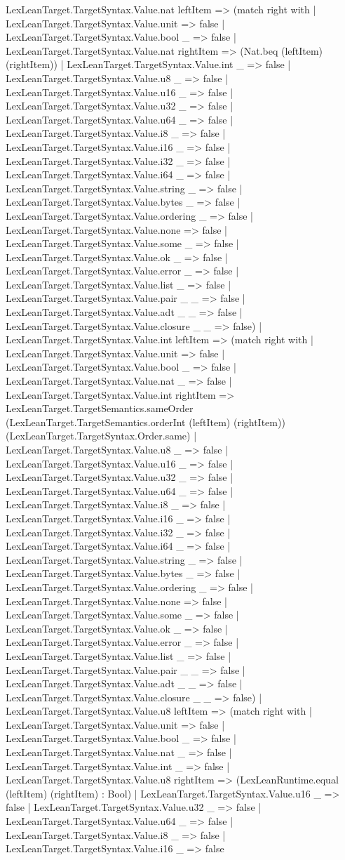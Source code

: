 \documentclass[11pt]{article}
\begin{document}
LexLeanTarget.TargetSyntax.Value.nat leftItem => (match right with | LexLeanTarget.TargetSyntax.Value.unit => false | LexLeanTarget.TargetSyntax.Value.bool \_ => false | LexLeanTarget.TargetSyntax.Value.nat rightItem => (Nat.beq (leftItem) (rightItem)) | LexLeanTarget.TargetSyntax.Value.int \_ => false | LexLeanTarget.TargetSyntax.Value.u8 \_ => false | LexLeanTarget.TargetSyntax.Value.u16 \_ => false | LexLeanTarget.TargetSyntax.Value.u32 \_ => false | LexLeanTarget.TargetSyntax.Value.u64 \_ => false | LexLeanTarget.TargetSyntax.Value.i8 \_ => false | LexLeanTarget.TargetSyntax.Value.i16 \_ => false | LexLeanTarget.TargetSyntax.Value.i32 \_ => false | LexLeanTarget.TargetSyntax.Value.i64 \_ => false | LexLeanTarget.TargetSyntax.Value.string \_ => false | LexLeanTarget.TargetSyntax.Value.bytes \_ => false | LexLeanTarget.TargetSyntax.Value.ordering \_ => false | LexLeanTarget.TargetSyntax.Value.none => false | LexLeanTarget.TargetSyntax.Value.some \_ => false | LexLeanTarget.TargetSyntax.Value.ok \_ => false | LexLeanTarget.TargetSyntax.Value.error \_ => false | LexLeanTarget.TargetSyntax.Value.list \_ => false | LexLeanTarget.TargetSyntax.Value.pair \_ \_ => false | LexLeanTarget.TargetSyntax.Value.adt \_ \_ => false | LexLeanTarget.TargetSyntax.Value.closure \_ \_ => false) | LexLeanTarget.TargetSyntax.Value.int leftItem => (match right with | LexLeanTarget.TargetSyntax.Value.unit => false | LexLeanTarget.TargetSyntax.Value.bool \_ => false | LexLeanTarget.TargetSyntax.Value.nat \_ => false | LexLeanTarget.TargetSyntax.Value.int rightItem => LexLeanTarget.TargetSemantics.sameOrder (LexLeanTarget.TargetSemantics.orderInt (leftItem) (rightItem)) (LexLeanTarget.TargetSyntax.Order.same) | LexLeanTarget.TargetSyntax.Value.u8 \_ => false | LexLeanTarget.TargetSyntax.Value.u16 \_ => false | LexLeanTarget.TargetSyntax.Value.u32 \_ => false | LexLeanTarget.TargetSyntax.Value.u64 \_ => false | LexLeanTarget.TargetSyntax.Value.i8 \_ => false | LexLeanTarget.TargetSyntax.Value.i16 \_ => false | LexLeanTarget.TargetSyntax.Value.i32 \_ => false | LexLeanTarget.TargetSyntax.Value.i64 \_ => false | LexLeanTarget.TargetSyntax.Value.string \_ => false | LexLeanTarget.TargetSyntax.Value.bytes \_ => false | LexLeanTarget.TargetSyntax.Value.ordering \_ => false | LexLeanTarget.TargetSyntax.Value.none => false | LexLeanTarget.TargetSyntax.Value.some \_ => false | LexLeanTarget.TargetSyntax.Value.ok \_ => false | LexLeanTarget.TargetSyntax.Value.error \_ => false | LexLeanTarget.TargetSyntax.Value.list \_ => false | LexLeanTarget.TargetSyntax.Value.pair \_ \_ => false | LexLeanTarget.TargetSyntax.Value.adt \_ \_ => false | LexLeanTarget.TargetSyntax.Value.closure \_ \_ => false) | LexLeanTarget.TargetSyntax.Value.u8 leftItem => (match right with | LexLeanTarget.TargetSyntax.Value.unit => false | LexLeanTarget.TargetSyntax.Value.bool \_ => false | LexLeanTarget.TargetSyntax.Value.nat \_ => false | LexLeanTarget.TargetSyntax.Value.int \_ => false | LexLeanTarget.TargetSyntax.Value.u8 rightItem => (LexLeanRuntime.equal (leftItem) (rightItem) : Bool) | LexLeanTarget.TargetSyntax.Value.u16 \_ => false | LexLeanTarget.TargetSyntax.Value.u32 \_ => false | LexLeanTarget.TargetSyntax.Value.u64 \_ => false | LexLeanTarget.TargetSyntax.Value.i8 \_ => false | LexLeanTarget.TargetSyntax.Value.i16 \_ => false 
\end{document}

